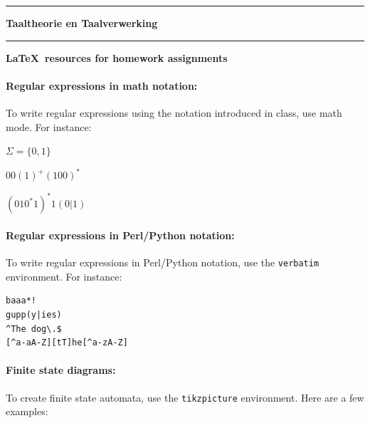 \documentclass[11pt]{article}
\begin{document}
\rule{\textwidth}{1pt}

\textbf{Taaltheorie en Taalverwerking}

\rule{\textwidth}{1pt}

\begin{center}\bf
\LaTeX\ resources for homework assignments
\end{center}
\vspace*{10pt}



\paragraph{Regular expressions in math notation:} To write regular expressions using
the notation introduced in class, use math mode. For instance:

$\Sigma =\{0,1\}$

$00(1)^+(100)^*$

$(010^*1)^*1(0|1)$

\paragraph{Regular expressions in Perl/Python notation:}
To write regular expressions in Perl/Python notation, use the \texttt{verbatim} environment. For instance:

\begin{verbatim}
baaa*!
gupp(y|ies)
^The dog\.$
[^a-aA-Z][tT]he[^a-zA-Z]
\end{verbatim}



\paragraph{Finite state diagrams:}
To create finite state automata, use the \texttt{tikzpicture} environment.
Here are a few examples:


\begin{center}
\end{center}
\end{document}
